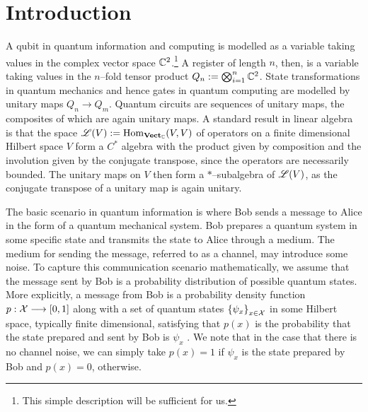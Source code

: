 
\pagebreak

\section{Introduction}

A qubit in quantum information and computing is modelled as a variable taking
values in the complex vector space $\mathbb{C}^2$.\footnote{This simple description will
be sufficient for us.} A register of length $n$, then, is a variable taking
values in the $n$--fold tensor product $Q_n := \bigotimes_{i = 1}^n \mathbb{C}^2$. State
transformations in quantum mechanics and hence gates in quantum computing are
modelled by unitary maps $Q_n \to Q_m$. Quantum circuits are sequences of
unitary maps, the composites of which are again unitary maps. A standard result
in linear algebra is that the space $\mathscr{L}(V) := \text{Hom}_{\textbf{Vect}_{\mathbb{C}}}(V, V)$ of
operators on a finite dimensional Hilbert space $V$ form a $C^*$ algebra with
the product given by composition and the involution given by the conjugate
transpose, since the operators are necessarily bounded. The unitary maps on $V$
then form a $*$--subalgebra of $\mathscr{L}(V)$, as the conjugate transpose of a
unitary map is again unitary.

The basic scenario in quantum information is where Bob sends a message to Alice
in the form of a quantum mechanical system. Bob prepares a quantum system in
some specific state and transmits the state to Alice through a medium. The
medium for sending the message, referred to as a channel, may introduce some
noise. To capture this communication scenario mathematically, we assume that the
message sent by Bob is a probability distribution of possible quantum states.
More explicitly, a message from Bob is a probability density function
$p : \mathcal{X} \stackrel{}{\longrightarrow} \left[ 0, 1 \right]$ along with a set of quantum states
$\set{\psi_x}_{x \in \mathcal{X}}$ in some Hilbert space, typically finite
dimensional, satisfying that $p(x)$ is the probability that the state prepared
and sent by Bob is $\psi_x$ \cite{cqshannon}. We note that in the case that
there is no channel noise, we can simply take $p(x) = 1$ if $\psi_x$ is the
state prepared by Bob and $p(x) = 0$, otherwise.

